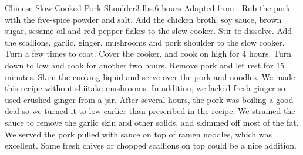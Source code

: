 \newpage
\begin{recipe}{Chinese Slow Cooked Pork Shoulder}{3 lbs.}{6 hours}
\freeform Adapted from \emph{}.
Rub the pork with the five-spice powder and salt.
Add the chicken broth, soy sauce, brown sugar, sesame oil and red pepper flakes to the slow cooker.  Stir to dissolve.
Add the scallions, garlic, ginger, mushrooms and pork shoulder to the slow cooker.  Turn a few times to coat.  Cover the cooker, and cook on high for 4 hours.  Turn down to low and cook for another two hours. 
Remove pork and let rest for 15 minutes.  Skim the cooking liquid and serve over the pork and noodles.
\freeform We made this recipe without shiitake mushrooms. In addition, we lacked fresh ginger so used crushed ginger from a jar. After several hours, the pork was boiling a good deal so we turned it to low earlier than prescribed in the recipe. We strained the sauce to remove the garlic skin and other solids, and skimmed off most of the fat. We served the pork pulled with sauce on top of ramen noodles, which was excellent. Some fresh chives or chopped scallions on top could be a nice addition.
\end{recipe}
